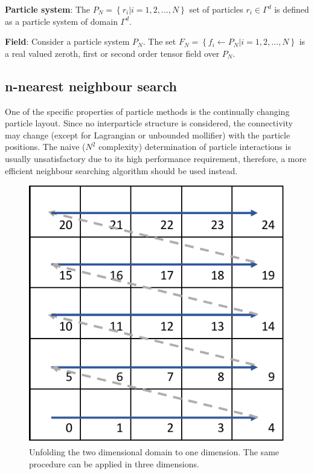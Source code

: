 \documentclass[a4paper,12pt,openany]{book}
\theoremstyle{break}
\begin{document}
\textbf{Particle system}: The $P_{N}=\left\{r_i|i=1,2,...,N\right\}$ set of particles $r_i\in\Gamma^d$ is defined as a particle system of domain $\Gamma^d$.

\textbf{Field}: Consider a particle system $P_N$. The set $F_N=\left\{f_i\leftarrow P_N \vert i=1,2,...,N\right\}$ is a real valued zeroth, first or second order tensor field over $P_N$.

\subsection{n-nearest neighbour search} \label{sec:neighbour_search}
One of the specific properties of particle methods is the continually changing particle layout. Since no interparticle structure is considered, the connectivity may change (except for Lagrangian or unbounded mollifier) with the particle positions. The naive ($N^2$ complexity) determination of particle interactions is usually unsatisfactory due to its high performance requirement, therefore, a more efficient neighbour searching algorithm should be used instead. \\
\begin{figure}[h!]
  \includegraphics[scale=0.6]{hash_key.pdf}
  \centering
  \caption{Unfolding the two dimensional domain to one dimension. The same procedure can be applied in three dimensions.}
  \label{fig:unfolding}
\end{figure}\vspace*{3pt}
\end{document}
